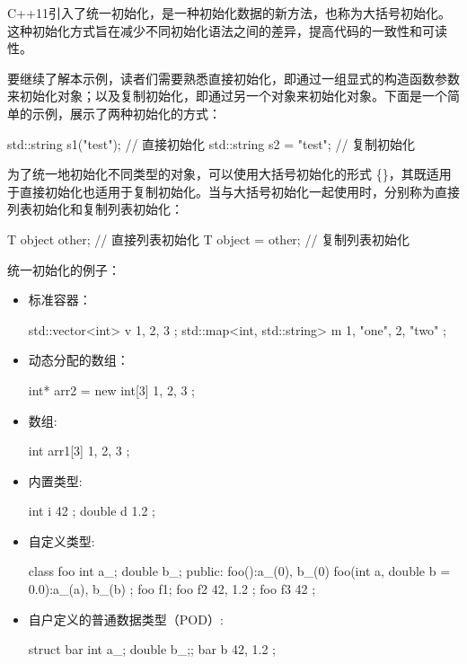 
C++11引入了统一初始化，是一种初始化数据的新方法，也称为大括号初始化。这种初始化方式旨在减少不同初始化语法之间的差异，提高代码的一致性和可读性。


要继续了解本示例，读者们需要熟悉直接初始化，即通过一组显式的构造函数参数来初始化对象；以及复制初始化，即通过另一个对象来初始化对象。下面是一个简单的示例，展示了两种初始化的方式：

\begin{cpp}
std::string s1("test");   // 直接初始化
std::string s2 = "test";  // 复制初始化
\end{cpp}


为了统一地初始化不同类型的对象，可以使用大括号初始化的形式 \{\}，其既适用于直接初始化也适用于复制初始化。当与大括号初始化一起使用时，分别称为直接列表初始化和复制列表初始化：

\begin{cpp}
T object {other};   // 直接列表初始化
T object = {other}; // 复制列表初始化
\end{cpp}

统一初始化的例子：

\begin{itemize}
\item
标准容器：

\begin{cpp}
std::vector<int> v { 1, 2, 3 };
std::map<int, std::string> m { {1, "one"}, { 2, "two" }};
\end{cpp}

\item
动态分配的数组：

\begin{cpp}
int* arr2 = new int[3]{ 1, 2, 3 };
\end{cpp}

\item
数组:

\begin{cpp}
int arr1[3] { 1, 2, 3 };
\end{cpp}

\item
内置类型:

\begin{cpp}
int i { 42 };
double d { 1.2 };
\end{cpp}

\item
自定义类型:

\begin{cpp}
class foo
{
    int a_;
    double b_;
    public:
    foo():a_(0), b_(0) {}
    foo(int a, double b = 0.0):a_(a), b_(b) {}
};
foo f1{};
foo f2{ 42, 1.2 };
foo f3{ 42 };
\end{cpp}

\item
自户定义的普通数据类型（POD）:

\begin{cpp}
struct bar { int a_; double b_;};
bar b{ 42, 1.2 };
\end{cpp}
\end{itemize}

